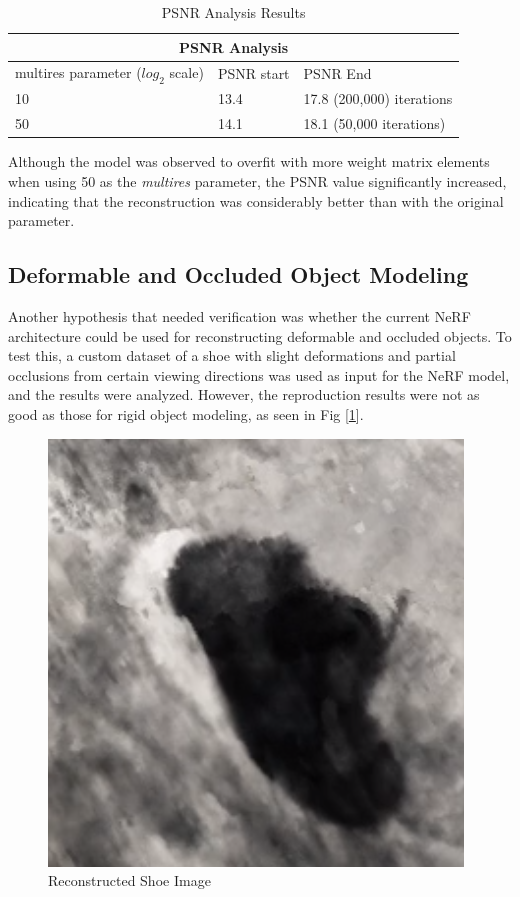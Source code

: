 \documentclass[conference]{IEEEtran}
\begin{document}
\begin{table}[h!]
\centering
\begin{tabular}{ |p{2.5cm}|p{2cm}|p{2cm}|  }
 \hline
 \multicolumn{3}{|c|}{PSNR Analysis} \\
 \hline
 multires parameter ($log_2$ scale) & PSNR start & PSNR End \\
 \hline
 10  & 13.4    & 17.8 (200,000) iterations \\ \hline
 50  &   14.1  & 18.1 (50,000 iterations) \\
 \hline 
\end{tabular}
\vspace{2mm}
 \caption{PSNR Analysis Results}
\label{table:1}
\end{table}

Although the model was observed to overfit with more weight matrix elements when using 50 as the \textit{multires} parameter, the PSNR value significantly increased, indicating that the reconstruction was considerably better than with the original parameter.

\subsection{Deformable and Occluded Object Modeling}
Another hypothesis that needed verification was whether the current NeRF architecture could be used for reconstructing deformable and occluded objects. To test this, a custom dataset of a shoe with slight deformations and partial occlusions from certain viewing directions was used as input for the NeRF model, and the results were analyzed. However, the reproduction results were not as good as those for rigid object modeling, as seen in Fig [\ref{fig:shoe}].

\begin{figure} [h]
\centering
  \includegraphics[scale = 0.35]{figures/results/shoe.png}  
  \caption{\label{fig:shoe} Reconstructed Shoe Image}
\end{figure}
\end{document}
